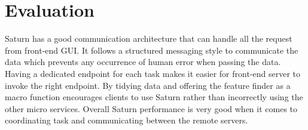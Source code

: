 \section{Evaluation}
Saturn has a good communication architecture that can handle all the request from front-end GUI. It follows a structured messaging style to communicate the data which prevents any occurrence of human error when passing the data. Having a dedicated endpoint for each task makes it easier for front-end server to invoke the right endpoint. By tidying data and offering the feature finder as a macro function encourages clients to use Saturn rather than incorrectly using the other micro services. Overall Saturn performance is very good when it comes to coordinating task and communicating between the remote servers.